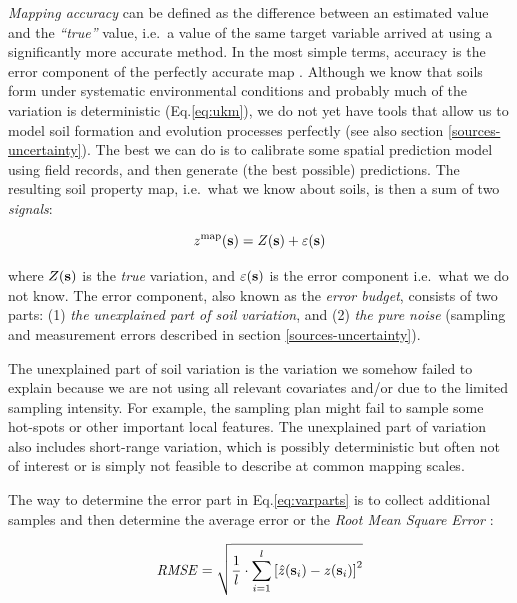 \documentclass[11pt]{krantz}
\theoremstyle{definition}
\theoremstyle{definition}
\theoremstyle{definition}
\theoremstyle{remark}
\begin{document}
\emph{Mapping accuracy} can be defined as the difference between an
estimated value and the \emph{``true''} value, i.e.~a value of the same
target variable arrived at using a significantly more accurate method.
In the most simple terms, accuracy is the error component of the
perfectly accurate map \citep{mowrer2000quantifying}. Although we know
that soils form under systematic environmental conditions and probably
much of the variation is deterministic (Eq.\eqref{eq:ukm}), we do not yet
have tools that allow us to model soil formation and evolution processes
perfectly (see also section \ref{sources-uncertainty}). The best we can
do is to calibrate some spatial prediction model using field records,
and then generate (the best possible) predictions. The resulting soil
property map, i.e.~what we know about soils, is then a sum of two
\emph{signals}:

\begin{equation}
z^{\rm{map}}({\bf{s}}) = Z({\bf{s}}) + \varepsilon({\bf{s}})
\label{eq:varparts}
\end{equation}

where \(Z({\bf{s}})\) is the \emph{true} variation, and
\(\varepsilon({\bf{s}})\) is the error component i.e.~what we do not
know. The error component, also known as the \emph{error budget},
consists of two parts: (1) \emph{the unexplained part of soil
variation}, and (2) \emph{the pure noise} (sampling and measurement
errors described in section \ref{sources-uncertainty}).

The unexplained part of soil variation is the variation we somehow
failed to explain because we are not using all relevant covariates
and/or due to the limited sampling intensity. For example, the sampling
plan might fail to sample some hot-spots or other important local
features. The unexplained part of variation also includes short-range
variation, which is possibly deterministic but often not of interest or
is simply not feasible to describe at common mapping scales.

The way to determine the error part in Eq.\eqref{eq:varparts} is to
collect additional samples and then determine the average error or the
\emph{Root Mean Square Error}
\citep{goovaerts2001geostatistical, Finke2006Elsevier, LiHeap2010EI}:

\begin{equation}
{\it RMSE} = \sqrt {\frac{1}{l} \cdot \sum\limits_{i = 1}^l {\left[
{\hat z({\bf{s}}_i ) - z ({\bf{s}}_i )} \right]^2 } }
\label{eq:RMSE}
\end{equation}
\end{document}
